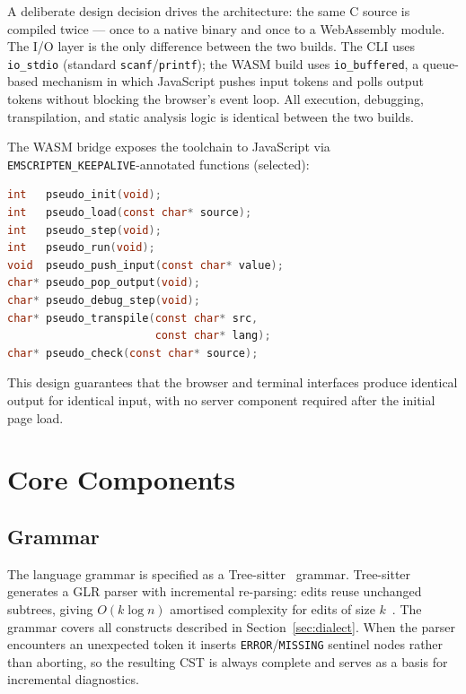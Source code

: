 \documentclass[conference]{IEEEtran}
\begin{document}
A deliberate design decision drives the architecture: the same C source is
compiled twice --- once to a native binary and once to a WebAssembly module.
The I/O layer is the only difference between the two builds.  The CLI uses
\texttt{io\_stdio} (standard \texttt{scanf}/\texttt{printf}); the WASM build
uses \texttt{io\_buffered}, a queue-based mechanism in which JavaScript pushes
input tokens and polls output tokens without blocking the browser's event loop.
All execution, debugging, transpilation, and static analysis logic is
identical between the two builds.

The WASM bridge exposes the toolchain to JavaScript via
\texttt{EMSCRIPTEN\_KEEPALIVE}-annotated functions (selected):

\begin{lstlisting}[language=C, frame=none]
int   pseudo_init(void);
int   pseudo_load(const char* source);
int   pseudo_step(void);
int   pseudo_run(void);
void  pseudo_push_input(const char* value);
char* pseudo_pop_output(void);
char* pseudo_debug_step(void);
char* pseudo_transpile(const char* src,
                       const char* lang);
char* pseudo_check(const char* source);
\end{lstlisting}

This design guarantees that the browser and terminal interfaces produce
identical output for identical input, with no server component required after
the initial page load.

\section{Core Components}
\label{sec:components}

\subsection{Grammar}

The language grammar is specified as a Tree-sitter~\cite{treesitter} grammar.
Tree-sitter generates a GLR parser with incremental re-parsing: edits reuse
unchanged subtrees, giving $O(k \log n)$ amortised complexity for edits of
size $k$~\cite{treesitter-thesis}.  The grammar covers all constructs
described in Section~\ref{sec:dialect}.  When the parser encounters
an unexpected token it inserts \texttt{ERROR}/\texttt{MISSING} sentinel nodes
rather than aborting, so the resulting CST is always complete and serves as a
basis for incremental diagnostics.
\end{document}
